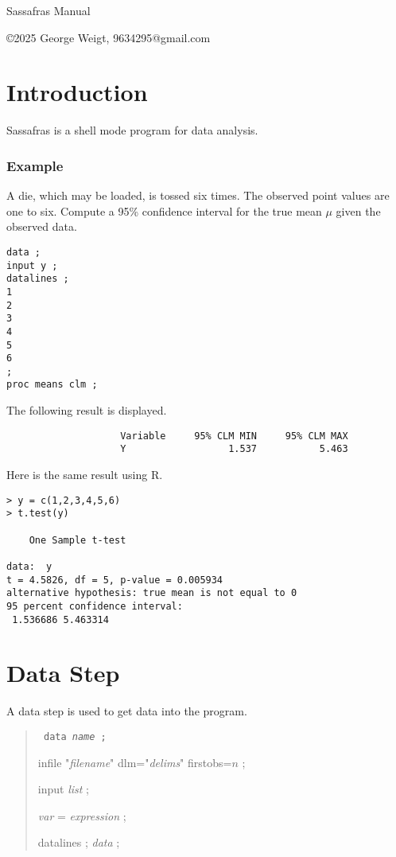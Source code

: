 \documentclass[12pt]{article}
\begin{document}
\begin{center}
{\LARGE Sassafras Manual}
\end{center}

\tableofcontents

\vfill
\copyright 2025 George Weigt, 9634295@gmail.com
\newpage

\section{Introduction}

Sassafras is a shell mode program for data analysis.

\subsubsection*{Example}

A die, which may be loaded, is tossed six times.
The observed point values are one to six.
Compute a 95\% confidence interval for the true mean $\mu$
given the observed data.

{\footnotesize\begin{verbatim}
data ;
input y ;
datalines ;
1
2
3
4
5
6
;
proc means clm ;
\end{verbatim}}

The following result is displayed.

{\footnotesize\begin{verbatim}
                    Variable     95% CLM MIN     95% CLM MAX
                    Y                  1.537           5.463
\end{verbatim}}

Here is the same result using R.

{\footnotesize\begin{verbatim}
> y = c(1,2,3,4,5,6)
> t.test(y)

	One Sample t-test

data:  y
t = 4.5826, df = 5, p-value = 0.005934
alternative hypothesis: true mean is not equal to 0
95 percent confidence interval:
 1.536686 5.463314
\end{verbatim}}

\newpage

\section{Data Step}
A data step is used to get data into the program.

\begin{quote}
{\tt
data {\it name} ;

infile "{\it filename}" dlm="{\it delims}" firstobs=$n$ ;

input {\it list} ;

{\it var} = {\it expression} ;

datalines ; {\it data} ;
}
\end{quote}
\end{document}
